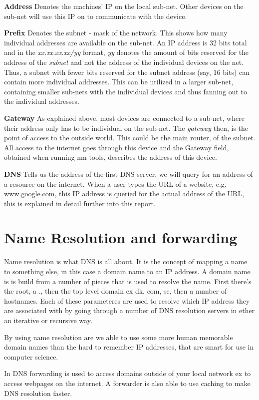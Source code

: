 \textbf{Address} 
Denotes the machines' IP on the local sub-net. Other devices on the sub-net will use this IP on to communicate with the device.

\textbf{Prefix} 
Denotes the subnet - mask of the network. This shows how many individual addresses are available on the sub-net. An IP address is 32 bits total and in the \textit{xx.xx.xx.xx/yy} format, \textit{yy} denotes the amount of bits reserved for the address of the \textit{subnet} and not the address of the individual devices on the net. Thus, a subnet with fewer bits reserved for the subnet address (say, 16 bits) can contain more individual addresses. This can be utilized in a larger sub-net, containing smaller sub-nets with the individual devices and thus fanning out to the individual addresses. 

\textbf{Gateway}
As explained above, most devices are connected to a sub-net, where their address only has to be individual on the sub-net. The \textit{gateway} then, is the point of access to the outside world. This could be the main router, of the subnet. All access to the internet goes through this device and the Gateway field, obtained when running nm-tools, describes the address of this device. 

\textbf{DNS}
Tells us the address of the first DNS server, we will query for an address of a resource on the internet. When a user types the URL of a website, e.g. www.google.com, this IP address is queried for the actual address of the URL, this is explained in detail further into this report.


\section{Name Resolution and forwarding}
Name resolution is what DNS is all about. It is the concept of mapping a name to something else, in this case a domain name to an IP address. A domain name is is build from a number of pieces that is used to resolve the name. First there's the root, a ., then the top level domain ex dk, com, se, then a number of hostnames. Each of these parameteres are used to resolve which IP address they are associated with by going through a number of DNS resolution servers in ether an iterative or recursive way.

By using name resolution are we able to use some more human memorable domain names than the hard to remember IP addresses, that are smart for use in computer science.

In DNS forwarding is used to access domains outside of your local network ex to access webpages on the internet. A forwarder is also able to use caching to make DNS resolution faster.
